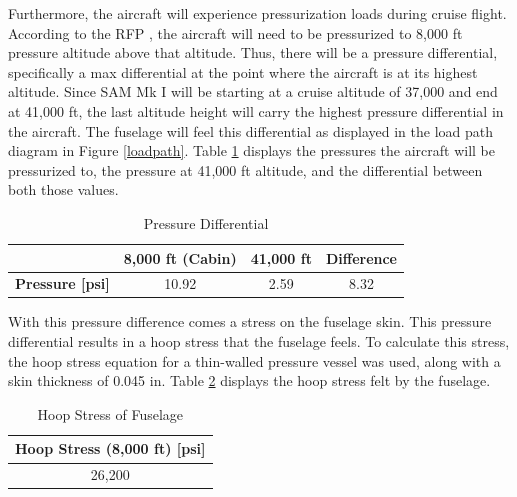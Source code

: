 \newpage
Furthermore, the aircraft will experience pressurization loads during cruise flight. According to the RFP \cite{RFP}, the aircraft will need to be pressurized to 8,000 ft pressure altitude above that altitude. Thus, there will be a pressure differential, specifically a max differential at the point where the aircraft is at its highest altitude. Since SAM Mk I will be starting at a cruise altitude of 37,000 and end at 41,000 ft, the last altitude height will carry the highest pressure differential in the aircraft. The fuselage will feel this differential as displayed in the load path diagram in Figure \ref{loadpath}.
Table \ref{tab:pres} displays the pressures the aircraft will be pressurized to, the pressure at 41,000 ft altitude, and the differential between both those values. 

\begin{table}[!h]
    \centering
    \caption{Pressure Differential}
    \begin{tabular}{|c|c|c|c|}\toprule 
     & \textbf{8,000 ft (Cabin)} & \textbf{41,000 ft} & \textbf{Difference} \\ \hline \hline
    \textbf{Pressure [psi]} & 10.92 & 2.59 & 8.32 \\ 
    \bottomrule
    \end{tabular}
    \label{tab:pres}
\end{table}

With this pressure difference comes a stress on the fuselage skin. This pressure differential results in a hoop stress that the fuselage feels. To calculate this stress, the hoop stress equation for a thin-walled pressure vessel was used, along with a skin thickness of 0.045 in. Table \ref{hoopstrs} displays the hoop stress felt by the fuselage.

\begin{table}[!h]
    \centering
    \caption{Hoop Stress of Fuselage}
    \begin{tabular}{|c|}\toprule 
    \textbf{Hoop Stress (8,000 ft) [psi]} \\ \hline
    26,200 \\ 
    \bottomrule
    \end{tabular}
    \label{hoopstrs}
\end{table}

